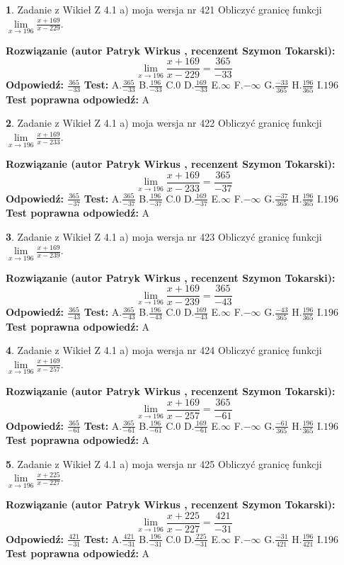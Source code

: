 \documentclass[12pt, a4paper]{article}
\theoremstyle{definition} %
\newtheorem{zad}{}
\newcommand{\zadStart}[1]{\begin{zad}#1\newline}
\newcommand{\zadStop}{\end{zad}}
\newcommand{\rozwStart}[2]{\noindent \textbf{Rozwiązanie (autor #1 , recenzent #2): }\newline}
\newcommand{\rozwStop}{\newline}
\newcommand{\odpStart}{\noindent \textbf{Odpowiedź:}\newline}
\newcommand{\odpStop}{\newline}
\newcommand{\testStart}{\noindent \textbf{Test:}\newline}
\newcommand{\testStop}{\newline}
\newcommand{\kluczStart}{\noindent \textbf{Test poprawna odpowiedź:}\newline}
\newcommand{\kluczStop}{\newline}
\begin{document}
\zadStart{Zadanie z Wikieł Z 4.1 a) moja wersja nr 421}
Obliczyć granicę funkcji $\lim\limits_{x\to196}\frac{x+169}{x-229}$.
\zadStop
\rozwStart{Patryk Wirkus}{Szymon Tokarski}
$$\lim\limits_{x\to196}\frac{x+169}{x-229} = \frac{365}{-33}$$
\rozwStop
\odpStart
$\frac{365}{-33}$
\odpStop
\testStart
A.$\frac{365}{-33}$
B.$\frac{196}{-33}$
C.$0$
D.$\frac{169}{-33}$
E.$\infty$
F.$-\infty$
G.$\frac{-33}{365}$
H.$\frac{196}{365}$
I.$196$
\testStop
\kluczStart
A
\kluczStop



\zadStart{Zadanie z Wikieł Z 4.1 a) moja wersja nr 422}
Obliczyć granicę funkcji $\lim\limits_{x\to196}\frac{x+169}{x-233}$.
\zadStop
\rozwStart{Patryk Wirkus}{Szymon Tokarski}
$$\lim\limits_{x\to196}\frac{x+169}{x-233} = \frac{365}{-37}$$
\rozwStop
\odpStart
$\frac{365}{-37}$
\odpStop
\testStart
A.$\frac{365}{-37}$
B.$\frac{196}{-37}$
C.$0$
D.$\frac{169}{-37}$
E.$\infty$
F.$-\infty$
G.$\frac{-37}{365}$
H.$\frac{196}{365}$
I.$196$
\testStop
\kluczStart
A
\kluczStop



\zadStart{Zadanie z Wikieł Z 4.1 a) moja wersja nr 423}
Obliczyć granicę funkcji $\lim\limits_{x\to196}\frac{x+169}{x-239}$.
\zadStop
\rozwStart{Patryk Wirkus}{Szymon Tokarski}
$$\lim\limits_{x\to196}\frac{x+169}{x-239} = \frac{365}{-43}$$
\rozwStop
\odpStart
$\frac{365}{-43}$
\odpStop
\testStart
A.$\frac{365}{-43}$
B.$\frac{196}{-43}$
C.$0$
D.$\frac{169}{-43}$
E.$\infty$
F.$-\infty$
G.$\frac{-43}{365}$
H.$\frac{196}{365}$
I.$196$
\testStop
\kluczStart
A
\kluczStop



\zadStart{Zadanie z Wikieł Z 4.1 a) moja wersja nr 424}
Obliczyć granicę funkcji $\lim\limits_{x\to196}\frac{x+169}{x-257}$.
\zadStop
\rozwStart{Patryk Wirkus}{Szymon Tokarski}
$$\lim\limits_{x\to196}\frac{x+169}{x-257} = \frac{365}{-61}$$
\rozwStop
\odpStart
$\frac{365}{-61}$
\odpStop
\testStart
A.$\frac{365}{-61}$
B.$\frac{196}{-61}$
C.$0$
D.$\frac{169}{-61}$
E.$\infty$
F.$-\infty$
G.$\frac{-61}{365}$
H.$\frac{196}{365}$
I.$196$
\testStop
\kluczStart
A
\kluczStop



\zadStart{Zadanie z Wikieł Z 4.1 a) moja wersja nr 425}
Obliczyć granicę funkcji $\lim\limits_{x\to196}\frac{x+225}{x-227}$.
\zadStop
\rozwStart{Patryk Wirkus}{Szymon Tokarski}
$$\lim\limits_{x\to196}\frac{x+225}{x-227} = \frac{421}{-31}$$
\rozwStop
\odpStart
$\frac{421}{-31}$
\odpStop
\testStart
A.$\frac{421}{-31}$
B.$\frac{196}{-31}$
C.$0$
D.$\frac{225}{-31}$
E.$\infty$
F.$-\infty$
G.$\frac{-31}{421}$
H.$\frac{196}{421}$
I.$196$
\testStop
\kluczStart
A
\kluczStop
\end{document}
